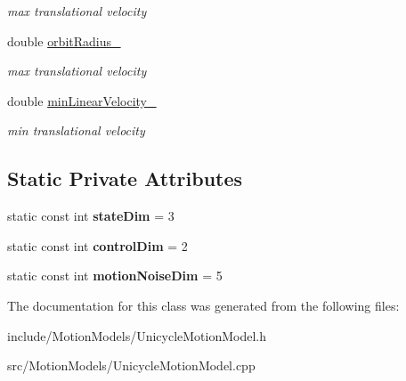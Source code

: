 \begin{DoxyCompactItemize}
\begin{DoxyCompactList}\small\item\em max translational velocity \end{DoxyCompactList}\item 
\hypertarget{class_unicycle_motion_model_a35645b20aa08d05a106d9698ccc71919}{double \hyperlink{class_unicycle_motion_model_a35645b20aa08d05a106d9698ccc71919}{orbit\-Radius\-\_\-}}\label{class_unicycle_motion_model_a35645b20aa08d05a106d9698ccc71919}

\begin{DoxyCompactList}\small\item\em max translational velocity \end{DoxyCompactList}\item 
\hypertarget{class_unicycle_motion_model_a0e1c9df0b9f1736a92bf10bcf5ad597f}{double \hyperlink{class_unicycle_motion_model_a0e1c9df0b9f1736a92bf10bcf5ad597f}{min\-Linear\-Velocity\-\_\-}}\label{class_unicycle_motion_model_a0e1c9df0b9f1736a92bf10bcf5ad597f}

\begin{DoxyCompactList}\small\item\em min translational velocity \end{DoxyCompactList}\end{DoxyCompactItemize}
\subsection*{\-Static \-Private \-Attributes}
\begin{DoxyCompactItemize}
\item 
\hypertarget{class_unicycle_motion_model_a419ce60de8ab632ca7a77e80c8c3cdfa}{static const int {\bfseries state\-Dim} = 3}\label{class_unicycle_motion_model_a419ce60de8ab632ca7a77e80c8c3cdfa}

\item 
\hypertarget{class_unicycle_motion_model_a1902c45c50d76f9ccdc50f605ef29540}{static const int {\bfseries control\-Dim} = 2}\label{class_unicycle_motion_model_a1902c45c50d76f9ccdc50f605ef29540}

\item 
\hypertarget{class_unicycle_motion_model_a7bea8e301903e72bb5bc7d8c953f1681}{static const int {\bfseries motion\-Noise\-Dim} = 5}\label{class_unicycle_motion_model_a7bea8e301903e72bb5bc7d8c953f1681}

\end{DoxyCompactItemize}


\-The documentation for this class was generated from the following files\-:\begin{DoxyCompactItemize}
\item 
include/\-Motion\-Models/\-Unicycle\-Motion\-Model.\-h\item 
src/\-Motion\-Models/\-Unicycle\-Motion\-Model.\-cpp\end{DoxyCompactItemize}
